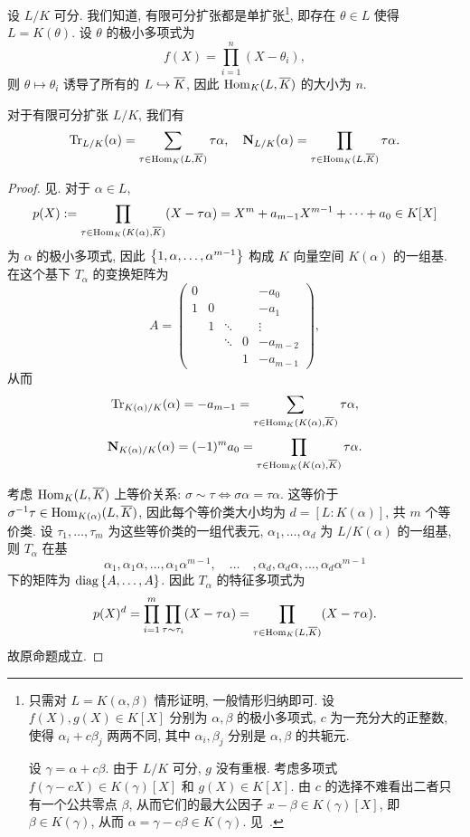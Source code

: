 设 $L/K$ 可分. 我们知道, 有限可分扩张都是单扩张\footnote{只需对 $L=K(\alpha,\beta)$ 情形证明, 一般情形归纳即可. 设 $f(X),g(X)\in K[X]$ 分别为 $\alpha,\beta$ 的极小多项式, $c$ 为一充分大的正整数, 使得 $\alpha_i+c\beta_j$ 两两不同, 其中 $\alpha_i,\beta_j$ 分别是 $\alpha,\beta$ 的共轭元.

设 $\gamma=\alpha+c\beta$.
由于 $L/K$ 可分, $g$ 没有重根.
考虑多项式 $f(\gamma-cX)\in K(\gamma)[X]$ 和 $g(X)\in K[X]$. 由 $c$ 的选择不难看出二者只有一个公共零点 $\beta$, 从而它们的最大公因子 $x-\beta\in K(\gamma)[X]$, 即 $\beta\in K(\gamma)$, 从而 $\alpha=\gamma-c\beta\in K(\gamma)$. 见~\cite[\S3.2 定理2]{FengLiZhang2009}.}, 即存在 $\theta\in L$ 使得 $L=K(\theta)$. 设 $\theta$ 的极小多项式为
  \[f(X)=\prod_{i=1}^n (X-\theta_i),\]
则 $\theta\mapsto \theta_i$ 诱导了所有的 $L\hookrightarrow \overline K$, 因此 ${\mathrm{Hom}}_K(L,\overline K)$ 的大小为 $n$.

\begin{proposition}{}{}
对于有限可分扩张 $L/K$, 我们有
  \[{\mathrm{Tr}}_{L/K}(\alpha)=\sum_{\tau\in{\mathrm{Hom}}_K(L,\overline K)}\tau\alpha,\quad 
    {\mathbf{N}}_{L/K}(\alpha)=\prod_{\tau\in{\mathrm{Hom}}_K(L,\overline K)}\tau\alpha.\]
\end{proposition}
\begin{proof}
见\cite[Chapter I, Proposition2.6]{Neukirch1999}.
对于 $\alpha\in L$, 
  \[p(X):=\prod_{\tau\in{\mathrm{Hom}}_K(K(\alpha),\overline K)} (X-\tau\alpha)=X^m+a_{m-1} X^{m-1}+\cdots+a_0\in K[X]\]
为 $\alpha$ 的极小多项式, 因此 $\left\{1,\alpha,\dots,\alpha^{m-1}\right\}$ 构成 $K$ 向量空间 $K(\alpha)$ 的一组基. 在这个基下 $T_\alpha$ 的变换矩阵为
  \[A=\begin{pmatrix}
     0 &   &        &   &-a_0\\
     1 & 0 &        &   &-a_1\\
       & 1 & \ddots &   &\vdots\\
       &   & \ddots & 0 &-a_{m-2}\\
       &   &        & 1 &-a_{m-1}
  \end{pmatrix},\]
从而
  \[{\mathrm{Tr}}_{K(\alpha)/K}(\alpha)=-a_{m-1}=\sum_{\tau\in{\mathrm{Hom}}_K(K(\alpha),\overline K)}\tau\alpha,\]
  \[{\mathbf{N}}_{K(\alpha)/K}(\alpha)=(-1)^m a_0=\prod_{\tau\in{\mathrm{Hom}}_K(K(\alpha),\overline K)}\tau\alpha.\]

考虑 ${\mathrm{Hom}}_K(L,\overline K)$ 上等价关系: $\sigma\sim \tau\iff \sigma \alpha=\tau\alpha$. 这等价于 $\sigma^{-1}\tau\in{\mathrm{Hom}}_{K(\alpha)}(L,\overline K)$, 因此每个等价类大小均为 $d=[L:K(\alpha)]$, 共 $m$ 个等价类. 设 $\tau_1,\dots,\tau_m$ 为这些等价类的一组代表元, $\alpha_1,\dots,\alpha_d$ 为 $L/K(\alpha)$ 的一组基, 则 $T_\alpha$ 在基 
	\[\alpha_1,\alpha_1\alpha,\dots,\alpha_1\alpha^{m-1},
  \quad\dots\quad,
	\alpha_d,\alpha_d\alpha,\dots,\alpha_d\alpha^{m-1}\]
下的矩阵为 ${\mathrm{diag}}\left\{A,\dots,A\right\}$. 因此 $T_\alpha$ 的特征多项式为
	\[p(X)^d=\prod_{i=1}^m\prod_{\tau\sim\tau_i}(X-\tau \alpha)=\prod_{\tau\in{\mathrm{Hom}}_K(L,\overline K)}(X-\tau\alpha).\]
故原命题成立.
\end{proof}

